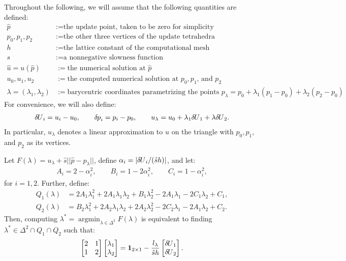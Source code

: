 \documentclass{article}
\begin{document}
Throughout the following, we will assume that the following quantities
are defined:
\begin{align*}
  \hat{p} &:= \text{the update point, taken to be zero for simplicity} \\
  p_0, p_1, p_2 &:= \text{the other three vertices of the update tetrahedra} \\
  h &:= \text{the lattice constant of the computational mesh} \\
  s &:= \text{a nonnegative slowness function} \\
  \hat{u} = u(\hat{p}) &:= \text{the numerical solution at $\hat{p}$} \\
  u_0, u_1, u_2 &:= \text{the computed numerical solution at $p_0, p_1$, and $p_2$} \\
  \lambda = (\lambda_1, \lambda_2) &:= \text{barycentric coordinates parametrizing the points $p_\lambda = p_0 + \lambda_1 (p_1 - p_0) + \lambda_2 (p_2 - p_0)$}
\end{align*}
For convenience, we will also define:
\begin{align*}
  {\delta \hspace{-0.09em} U}_i = u_i - u_0, \qquad {\delta \hspace{-0.08em} p}_i = p_i - p_0, \qquad u_\lambda = u_0 + \lambda_1 {\delta \hspace{-0.09em} U}_1 + \lambda {\delta \hspace{-0.09em} U}_2.
\end{align*}
In particular, $u_\lambda$ denotes a linear approximation to $u$ on
the triangle with $p_0, p_1$, and $p_2$ as its vertices.

\begin{lemma}
  Let $F(\lambda) = u_\lambda + \hat{s} ||\hat{p} - p_\lambda||$,
  define $\alpha_i = |{\delta \hspace{-0.09em} U}_i/(\hat{s} h)|$, and let:
  \begin{align*}
    A_i = 2 - \alpha_i^2, \qquad B_i = 1 - 2\alpha_i^2, \qquad C_i = 1 - \alpha_i^2,
  \end{align*}
  for $i = 1, 2$. Further, define:
  \begin{align*}
    Q_1(\lambda) &= 2A_1\lambda_1^2 + 2A_1\lambda_1\lambda_2 + B_1\lambda_2^2 -2A_1\lambda_1 -2C_1\lambda_2 + C_1, \\
    Q_2(\lambda) &= B_2\lambda_1^2 + 2A_2\lambda_1\lambda_2 + 2A_2\lambda_2^2 -2C_2\lambda_1 -2A_1\lambda_2 + C_2.
  \end{align*}
  Then, computing
  $\lambda^* = \operatorname{argmin}_{\lambda \in \Delta^2}
  F(\lambda)$ is equivalent to finding
  $\lambda^* \in \Delta^2 \cap Q_1 \cap Q_2$ such that:
  \begin{align*}
    \begin{bmatrix}
      2 & 1 \\ 1 & 2
    \end{bmatrix} \begin{bmatrix}
      \lambda_1 \\ \lambda_2
    \end{bmatrix} = \boldsymbol{1}_{2 \times 1} - \frac{l_\lambda}{\hat{s} h} \begin{bmatrix}
      {\delta \hspace{-0.09em} U}_1 \\ {\delta \hspace{-0.09em} U}_2
    \end{bmatrix}.
  \end{align*}
\end{lemma}
\end{document}

